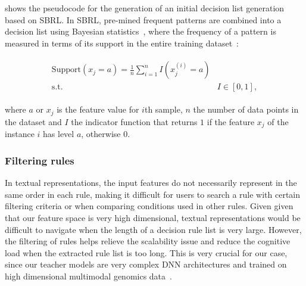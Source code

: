 \hspace*{3.5mm}  shows the pseudocode for the generation of an initial decision list generation based on SBRL. In SBRL, pre-mined frequent patterns are combined into a decision list using Bayesian statistics~\cite{molnar2019interpretable}, where the frequency of a pattern is measured in terms of its support in the entire training dataset~\cite{molnar2019interpretable}:

\vspace{-6mm}
\begin{align}
    \begin{array}{cl}
        \text {Support}\left(x_{j}=a\right)=\frac{1}{n} \sum_{i=1}^{n} I\left(x_{j}^{(i)}=a\right) \\
         \text {s.t.} & I \in[0,1],
    \end{array}
    \label{eq:support_eq}
\end{align}

\hspace*{3.5mm} where $a$ or $x_j$ is the feature value for $i$th sample, $n$ the number of data points in the dataset and $I$ the indicator function that returns $1$ if the feature $x_{j}$ of the instance $i$ has level $a$, otherwise $0$. 

\subsubsection{Filtering rules}
In textual representations, the input features do not necessarily represent in the same order in each rule, making it difficult for users to search a rule with certain filtering criteria or when comparing conditions used in other rules. Given given that our feature space is very high dimensional, textual representations would be difficult to navigate when the length of a decision rule list is very large. However, the filtering of rules helps relieve the scalability issue and reduce the cognitive load when the extracted rule list is too long. This is very crucial for our case, since our teacher models are very complex DNN architectures and trained on high dimensional multimodal genomics data~\cite{ribeiro2018anchors}. 

